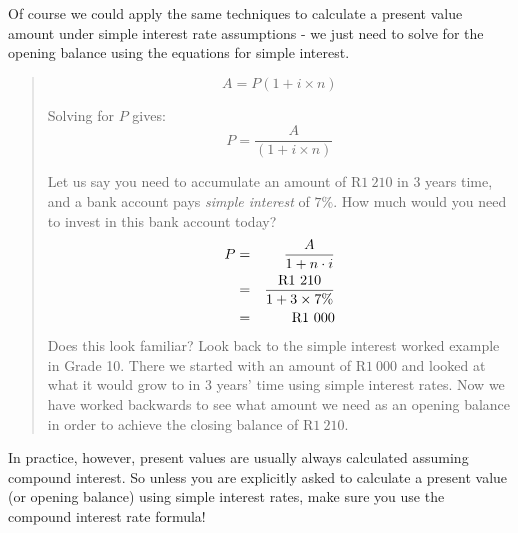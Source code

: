Of course we could apply the same techniques to calculate a present value amount under simple interest rate assumptions - we just need to solve for the opening balance using the equations for simple interest.
\begin{quote}
{\begin{equation}
A = P (1 + i\times n)
\end{equation}

Solving for $P$ gives:
\begin{equation}
P = \frac{A}{(1 + i\times n)}
\end{equation}

Let us say you need to accumulate an amount of R$1~210$ in 3 years time, and a bank account pays \textit{simple interest} of $7\%$. How much would you need to invest in this bank account today?
\begin{eqnarray*}
P &=& \frac{A}{1 + n\cdot i}\\
&=& \frac{\rm{R}1~210}{ 1 + 3 \times 7\%}\\
&=& \rm{R}1~000
\end{eqnarray*}
Does this look familiar? Look back to the simple interest worked example in Grade 10. There we started with an amount of R$1~000$ and looked at what it would grow to in 3 years' time using simple interest rates. Now we have worked backwards to see what amount we need as an opening balance in order to achieve the closing balance of R$1~210$.}
\end{quote}

In practice, however, present values are usually always calculated assuming compound interest. So unless you are explicitly asked to calculate a present value (or opening balance) using simple interest rates, make sure you use the compound interest rate formula!



